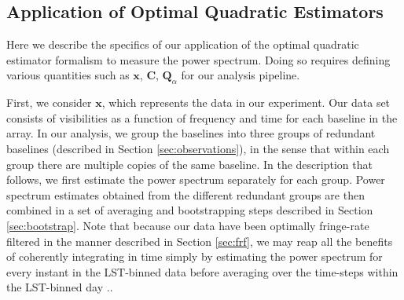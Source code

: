 \documentclass[twocolumn,numberedappendix]{emulateapj} \shorttitle{PSA64}
\newcommand{\x}{\mathbf{x}} \newcommand{\xhat}{\hat{\mathbf{x}}}
\newcommand{\phat}{\hat{\mathbf{p}}}
\newcommand{\qhat}{\hat{\mathbf{q}}}
\begin{document}
%


\subsection{Application of Optimal Quadratic Estimators}
\label{sec:oqe_app}

Here we describe the specifics of our application of the optimal quadratic
estimator formalism to measure the power spectrum. Doing so requires defining
various quantities such as $\x$, $\mathbf{C}$, $\mathbf{Q}_\alpha$ for our analysis
pipeline.

First, we consider $\x$, which represents the data in our experiment.  Our data set consists
of visibilities as a function of frequency and time for each baseline in the
array. In our analysis, we group the baselines into three groups of redundant baselines (described in
Section \ref{sec:observations}), 
in the sense that within each group there are multiple copies of the same baseline. In the
description that follows, we first estimate the power spectrum separately for each group.
Power spectrum estimates obtained from the different redundant groups are then combined in a set of averaging and bootstrapping steps described in Section \ref{sec:bootstrap}. Note that because
our data have been optimally fringe-rate filtered in the manner described in Section \ref{sec:frf},
we may reap all the benefits of coherently integrating in time simply by estimating the power spectrum
for every instant in the LST-binned data before averaging over the time-steps within the LST-binned day \citep{parsons_et_al2015}..
\end{document}
